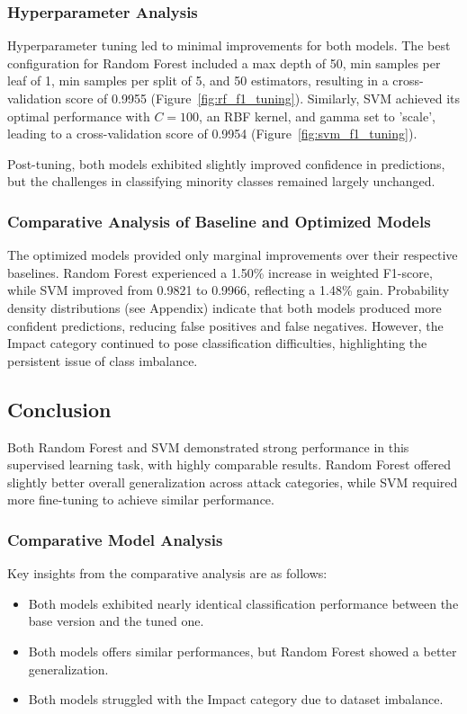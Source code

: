             \subsubsection*{Hyperparameter Analysis\\}
            Hyperparameter tuning led to minimal improvements for both models. The best configuration for Random Forest included a max depth of 50, min samples per leaf of 1, min samples per split of 5, and 50 estimators, resulting in a cross-validation score of 0.9955 (Figure~\ref{fig:rf_f1_tuning}). Similarly, SVM achieved its optimal performance with \( C = 100 \), an RBF kernel, and gamma set to 'scale', leading to a cross-validation score of 0.9954 (Figure~\ref{fig:svm_f1_tuning}). 
            
            Post-tuning, both models exhibited slightly improved confidence in predictions, but the challenges in classifying minority classes remained largely unchanged.
            
            \subsubsection*{Comparative Analysis of Baseline and Optimized Models\\}
            The optimized models provided only marginal improvements over their respective baselines. Random Forest experienced a 1.50\% increase in weighted F1-score, while SVM improved from 0.9821 to 0.9966, reflecting a 1.48\% gain. Probability density distributions (see Appendix) indicate that both models produced more confident predictions, reducing false positives and false negatives. However, the Impact category continued to pose classification difficulties, highlighting the persistent issue of class imbalance.

            \subsection{Conclusion}
            Both Random Forest and SVM demonstrated strong performance in this supervised learning task, with highly comparable results. Random Forest offered slightly better overall generalization across attack categories, while SVM required more fine-tuning to achieve similar performance. 
            
            \subsubsection{Comparative Model Analysis\\}
            Key insights from the comparative analysis are as follows:
            \begin{itemize}
                \item Both models exhibited nearly identical classification performance between the base version and the tuned one.
                \item Both models offers similar performances, but Random Forest showed a better generalization.
                \item Both models struggled with the Impact category due to dataset imbalance.
            \end{itemize}
            
